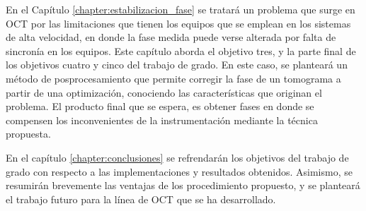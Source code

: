 En el Capítulo \ref{chapter:estabilizacion_fase} se tratará un problema que surge en OCT por las limitaciones que tienen los equipos que se emplean en los sistemas de alta velocidad, en donde la fase medida puede verse alterada por falta de sincronía en los equipos. Este capítulo aborda el objetivo tres, y la parte final de los objetivos cuatro y cinco del trabajo de grado. En este caso, se planteará un método de posprocesamiento que permite corregir la fase de un tomograma a partir de una optimización, conociendo las características que originan el problema. El producto final que se espera, es obtener fases en donde se compensen los inconvenientes de la instrumentación mediante la técnica propuesta.

En el capítulo \ref{chapter:conclusiones} se refrendarán los objetivos del trabajo de grado con respecto a las implementaciones y resultados obtenidos. Asimismo, se resumirán brevemente las ventajas de los procedimiento propuesto, y se planteará el trabajo futuro para la línea de OCT que se ha desarrollado. 



